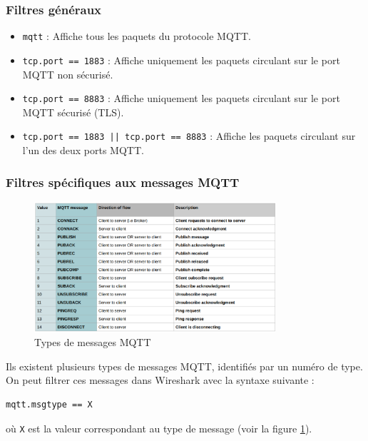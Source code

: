 \documentclass{article}
\begin{document}
\subsubsection{Filtres généraux}
\begin{itemize}
    \item \texttt{mqtt} : Affiche tous les paquets du protocole MQTT.
    \item \texttt{tcp.port == 1883} : Affiche uniquement les paquets circulant sur le port MQTT non sécurisé.
    \item \texttt{tcp.port == 8883} : Affiche uniquement les paquets circulant sur le port MQTT sécurisé (TLS).
    \item \texttt{tcp.port == 1883 || tcp.port == 8883} : Affiche les paquets circulant sur l'un des deux ports MQTT.
\end{itemize}

\subsubsection{Filtres spécifiques aux messages MQTT}

\begin{figure}[H]
    \centering
    \includegraphics[width=0.8\textwidth]{Images/msgtype.png}
    \caption{Types de messages MQTT}
    \label{fig:msgtype}
\end{figure}

Ils existent plusieurs types de messages MQTT, identifiés par un numéro de type.
On peut filtrer ces messages dans Wireshark avec la syntaxe suivante :

\begin{verbatim}
mqtt.msgtype == X
\end{verbatim}

où \texttt{X} est la valeur correspondant au type de message (voir la figure \ref{fig:msgtype}).
\end{document}
